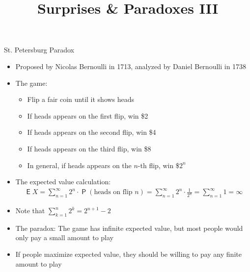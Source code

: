 \documentclass[10pt]{beamer}
\title{Surprises \& Paradoxes III}
\author{}
\date{}
\DeclareMathOperator\prb{\mathsf{P}}
\DeclareMathOperator\expc{\mathsf{E}}
\begin{document}
\begin{frame}
\titlepage
\end{frame}


\begin{frame}{St. Petersburg Paradox}
  \begin{itemize}[<+->]
    \item Proposed by Nicolas Bernoulli in 1713, analyzed by Daniel Bernoulli in 1738
    \item The game:
      \begin{itemize}
        \item Flip a fair coin until it shows heads
        \item If heads appears on the first flip, win \$2
        \item If heads appears on the second flip, win \$4
        \item If heads appears on the third flip, win \$8
        \item In general, if heads appears on the $n$-th flip, win \$$2^n$
      \end{itemize}
    \item The expected value calculation:
      \begin{align*}
        \expc{X} = \sum_{n=1}^{\infty} 2^n \cdot \prb(\text{heads on flip } n) = \sum_{n=1}^{\infty} 2^n \cdot \frac{1}{2^n} = \sum_{n=1}^{\infty} 1 = \infty
      \end{align*}
    \item Note that $\sum_{k=1}^n 2^k = 2^{n + 1} - 2$
    \item The paradox: The game has infinite expected value, but most people would only pay a small amount to play
    \item If people maximize expected value, they should be willing to pay any finite amount to play
  \end{itemize}
\end{frame}
\end{document}
